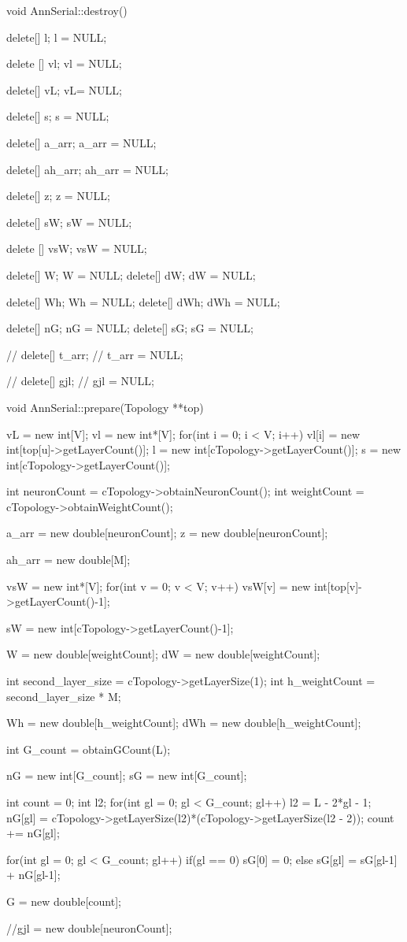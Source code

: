 void AnnSerial::destroy(){
	delete[] l;
	l = NULL;

  delete [] vl;
  vl = NULL;

  delete[] vL;
  vL= NULL;

	delete[] s;
	s = NULL;

	delete[] a_arr;
	a_arr = NULL;

  delete[] ah_arr;
  ah_arr = NULL;

	delete[] z;
	z = NULL;

	delete[] sW;
	sW = NULL;

  delete [] vsW;
  vsW = NULL;

	delete[] W;
	W = NULL;
	delete[] dW;
	dW = NULL;

  delete[] Wh;
  Wh = NULL;
  delete[] dWh;
  dWh = NULL;

  delete[] nG;
  nG = NULL;
  delete[] sG;
  sG = NULL;


	// delete[] t_arr;
	// t_arr = NULL;

	// delete[] gjl;
	// gjl = NULL;
}

void AnnSerial::prepare(Topology **top){

  vL = new int[V];
  vl = new int*[V];
  for(int i = 0; i < V; i++){
    vl[i] = new int[top[u]->getLayerCount()];
  }
	l = new int[cTopology->getLayerCount()];
	s = new int[cTopology->getLayerCount()];

	int neuronCount = cTopology->obtainNeuronCount();
	int weightCount = cTopology->obtainWeightCount();

	a_arr = new double[neuronCount];
	z = new double[neuronCount];

  ah_arr = new double[M];

  vsW = new int*[V];
  for(int v = 0; v < V; v++)
    vsW[v] = new int[top[v]->getLayerCount()-1];

	sW = new int[cTopology->getLayerCount()-1];

	W = new double[weightCount];
	dW = new double[weightCount];

  int second_layer_size = cTopology->getLayerSize(1);
  int h_weightCount = second_layer_size * M;

  Wh = new double[h_weightCount];
  dWh = new double[h_weightCount];

  int G_count = obtainGCount(L);


  nG = new int[G_count];
  sG = new int[G_count];

  int count = 0;
  int l2;
  for(int gl = 0; gl < G_count; gl++){
    l2 = L - 2*gl - 1;
    nG[gl] = cTopology->getLayerSize(l2)*(cTopology->getLayerSize(l2 - 2));
    count += nG[gl];
  }


  for(int gl = 0; gl < G_count; gl++){
    if(gl == 0)
      sG[0] = 0;
    else
      sG[gl] = sG[gl-1] + nG[gl-1];
  }

  G = new double[count];


	//gjl = new double[neuronCount];
}

